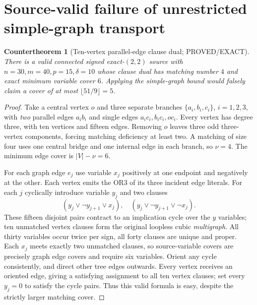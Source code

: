 \documentclass[11pt]{article}
\newtheorem{countertheorem}{Countertheorem}
\begin{document}
\section{Source-valid failure of unrestricted simple-graph transport}
\begin{countertheorem}[Ten-vertex parallel-edge clause dual; PROVED/EXACT]
There is a valid connected signed exact-$(2,2)$ source with $n=30,m=40,p=15,\delta=10$ whose clause dual has matching number $4$ and exact minimum variable cover $6$. Applying the simple-graph bound would falsely claim a cover of at most $\lfloor51/9\rfloor=5$.
\end{countertheorem}
\begin{proof}
Take a central vertex $o$ and three separate branches $\{a_i,b_i,c_i\}$, $i=1,2,3$, with \emph{two} parallel edges $a_ib_i$ and single edges $a_ic_i,b_ic_i,oc_i$. Every vertex has degree three, with ten vertices and fifteen edges. Removing $o$ leaves three odd three-vertex components, forcing matching deficiency at least two. A matching of size four uses one central bridge and one internal edge in each branch, so $\nu=4$. The minimum edge cover is $|V|-\nu=6$.

For each graph edge $e_j$ use variable $x_j$ positively at one endpoint and negatively at the other. Each vertex emits the OR3 of its three incident edge literals. For each $j$ cyclically introduce variable $y_j$ and two clauses
\[
(y_j\vee\neg y_{j+1}\vee x_j),\quad
(y_j\vee\neg y_{j+1}\vee\neg x_j).
\]
These fifteen disjoint pairs contract to an implication cycle over the $y$ variables; ten unmatched vertex clauses form the original loopless cubic \emph{multigraph}. All thirty variables occur twice per sign, all forty clauses are unique and proper. Each $x_j$ meets exactly two unmatched clauses, so source-variable covers are precisely graph edge covers and require six variables. Orient any cycle consistently, and direct other tree edges outwards. Every vertex receives an oriented edge, giving a satisfying assignment to all ten vertex clauses; set every $y_j=0$ to satisfy the cycle pairs. Thus this valid formula is easy, despite the strictly larger matching cover.
\end{proof}
\end{document}
